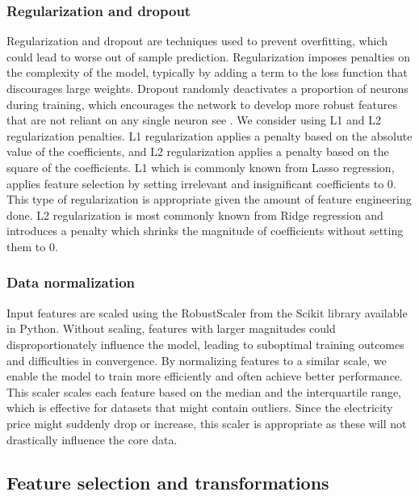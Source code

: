 \documentclass[10pt,a4paper]{article}
\numberwithin{equation}{section} %
\begin{document}
\subsubsection{Regularization and dropout}
Regularization and dropout are techniques used to prevent overfitting, which could lead to worse out of sample prediction.
 Regularization imposes penalties on the complexity of the model, typically by adding a term to the loss function that discourages large weights. Dropout randomly deactivates a proportion of neurons during training, which encourages the network to develop more robust features that are not reliant on any single neuron see \cite{Srivastava2014}.
 We consider using L1 and L2 regularization penalties.
 L1 regularization applies a penalty based on the absolute value of the coefficients, and L2 regularization applies a penalty based on the square of the coefficients. 
 L1 which is commonly known from Lasso regression, applies feature selection by setting irrelevant and insignificant coefficients to 0. This type of regularization is appropriate given the amount of feature engineering done.
 L2 regularization is most commonly known from Ridge regression and introduces a penalty which shrinks the magnitude of coefficients without setting them to 0.
 \subsubsection{Data normalization}
Input features are scaled using the RobustScaler from the Scikit library available in Python. 
Without scaling, features with larger magnitudes could disproportionately influence the model, leading to suboptimal training outcomes and difficulties in convergence. By normalizing features to a similar scale, we enable the model to train more efficiently and often achieve better performance.
This scaler scales each feature based on the median and the interquartile range, which is effective for datasets that might contain outliers.
Since the electricity price might suddenly drop or increase, this scaler is appropriate as these will not drastically influence the core data. 
\subsection{Feature selection and transformations}
\end{document}
